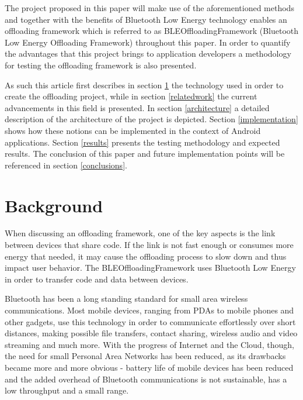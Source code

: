 \documentclass[twoside]{article}
\begin{document}
\begin{multicols}{2}
The project proposed in this paper will make use of the aforementioned methods and together with the benefits of Bluetooth Low Energy technology enables an offloading framework which is referred to as BLEOffloadingFramework  (Bluetooth Low Energy Offloading Framework) throughout this paper. In order to quantify the advantages that this project brings to application developers a methodology for testing the offloading framework is also presented.


As such this article first describes in section \ref{background} the technology used in order to create the offloading project, while in section \ref{relatedwork} the current advancements in this field is presented. In section \ref{architecture} a detailed description of the architecture of the project is depicted. Section \ref{implementation} shows how these notions can be implemented in the context of Android applications. Section \ref{results} presents the testing methodology and expected results. The conclusion of this paper and future implementation points will be referenced in section \ref{conclusions}.

\section{Background}
\label{background}

When discussing an offloading framework, one of the key aspects is the link between devices that share code. If the link is not fast enough or consumes more energy that needed, it may cause the offloading process to slow down and thus impact user behavior. The BLEOffloadingFramework uses Bluetooth Low Energy in order to transfer code and data between devices.


Bluetooth has been a long standing standard for small area wireless communications. Most mobile devices, ranging from PDAs to mobile phones and other gadgets, use this technology in order to communicate effortlessly over short distances, making possible file transfers, contact sharing, wireless audio and video streaming and much more. With the progress of Internet and the Cloud, though, the need for small Personal Area Networks has been reduced, as its drawbacks became more and more obvious - battery life of mobile devices has been reduced and the added overhead of Bluetooth communications is not sustainable, has a low throughput and a small range. 


\end{multicols}
\end{document}
